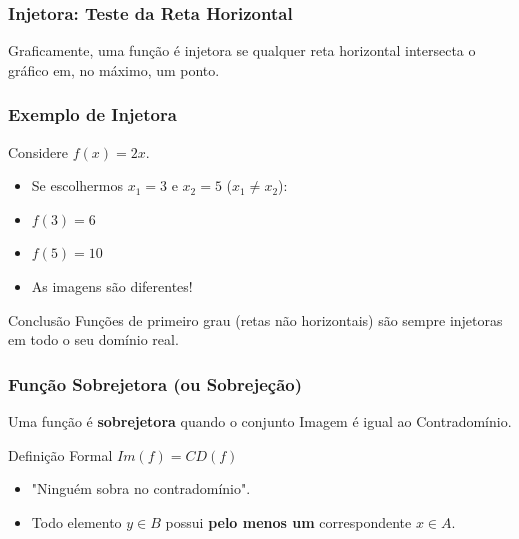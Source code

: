 \documentclass[9pt]{beamer}
\begin{document}
\begin{frame}
\frametitle{Injetora: Teste da Reta Horizontal}
Graficamente, uma função é injetora se qualquer reta horizontal intersecta o gráfico em, no máximo, um ponto.

\centering
{}
\end{frame}

\begin{frame}
\frametitle{Exemplo de Injetora}
Considere $f(x) = 2x$. 

\begin{itemize}
    \item Se escolhermos $x_1 = 3$ e $x_2 = 5$ ($x_1 \neq x_2$):
    \item $f(3) = 6$
    \item $f(5) = 10$
    \item As imagens são diferentes!
\end{itemize}

\begin{block}{Conclusão}
Funções de primeiro grau (retas não horizontais) são sempre injetoras em todo o seu domínio real.
\end{block}
\end{frame}

\begin{frame}
\frametitle{Função Sobrejetora (ou Sobrejeção)}
Uma função é \textbf{sobrejetora} quando o conjunto Imagem é igual ao Contradomínio.

\begin{block}{Definição Formal}
$Im(f) = CD(f)$
\end{block}

\begin{itemize}
    \item "Ninguém sobra no contradomínio".
    \item Todo elemento $y \in B$ possui \textbf{pelo menos um} correspondente $x \in A$.
\end{itemize}
\end{frame}
\end{document}
